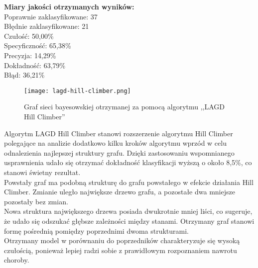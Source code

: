 \textbf{Miary jakości otrzymanych wyników:\\}
Poprawnie zaklasyfikowane:	37\\
Błędnie zaklasyfikowane:	21\\
Czułość:	50,00\%\\
Specyficzność:	65,38\%\\
Precyzja:	14,29\%\\
Dokładność:	63,79\%\\
Błąd:	36,21\%\\

\begin{figure}[H]
	\centering
	\texttt{[image: lagd-hill-climber.png]}
	\label{lagdhc}
	\caption{Graf sieci bayesowskiej otrzymanej za pomocą algorytmu ,,LAGD Hill Climber''}
\end{figure}

Algorytm LAGD Hill Climber stanowi rozszerzenie algorytmu Hill Climber polegające na analizie dodatkowo kilku kroków algorytmu wprzód w celu odnalezienia najlepszej struktury grafu. Dzięki zastosowaniu wspomnianego usprawnienia udało się otrzymać dokładność klasyfikacji wyższą o około 8,5\%, co stanowi świetny rezultat. \\
Powstały graf ma podobną strukturę do grafu powstałego w efekcie działania Hill Climber. Zmianie uległo największe drzewo grafu, a pozostałe dwa mniejsze pozostały bez zmian.  \\
Nowa struktura największego drzewa posiada dwukrotnie mniej liści, co sugeruje, że  udało się odszukać głębsze zależności między stanami. Otrzymany graf stanowi formę pośrednią pomiędzy poprzednimi dwoma strukturami. \\
Otrzymany model w porównaniu do poprzedników charakteryzuje się wysoką czułością, ponieważ  lepiej radzi sobie z prawidłowym rozpoznaniem nawrotu choroby.


